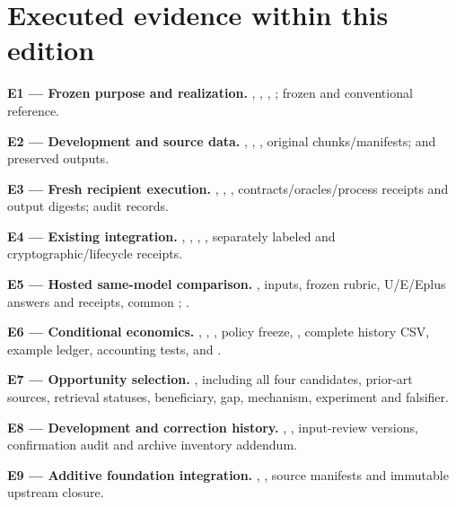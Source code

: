 \documentclass[10pt,a4paper]{article}
\begin{document}
\clearpage

\hypertarget{executed-evidence-within-this-edition}{%
\section{Executed evidence within this
edition}\label{executed-evidence-within-this-edition}}

\textbf{E1 --- Frozen purpose and realization.}
, ,
, ;
frozen  and conventional reference.

\textbf{E2 --- Development and source data.}
, ,
, original chunks/manifests;
 and preserved outputs.

\textbf{E3 --- Fresh recipient execution.}
, ,
,
contracts/oracles/process receipts and output digests; audit records.

\textbf{E4 --- Existing integration.} ,
, ,
, separately labeled
 and cryptographic/lifecycle receipts.

\textbf{E5 --- Hosted same-model comparison.}
, inputs, frozen rubric,
U/E/Eplus answers and receipts, common ;
.

\textbf{E6 --- Conditional economics.} ,
, , policy freeze,
, complete history CSV, example ledger,
accounting tests,  and .

\textbf{E7 --- Opportunity selection.}
, including all four candidates,
prior-art sources, retrieval statuses, beneficiary, gap, mechanism,
experiment and falsifier.

\textbf{E8 --- Development and correction history.}
,
, input-review versions,
confirmation audit and archive inventory addendum.

\textbf{E9 --- Additive foundation integration.}
, ,
source manifests and immutable upstream closure.
\end{document}

